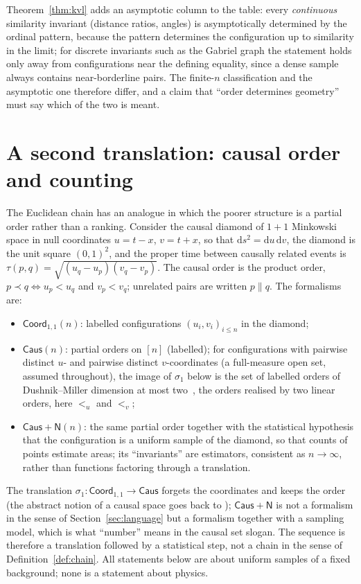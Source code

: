 \documentclass[11pt,a4paper]{article}
\theoremstyle{plain}
\theoremstyle{definition}
\theoremstyle{remark}
\newcommand{\Fcoord}{\mathsf{Coord}}
\newcommand{\Fcaus}{\mathsf{Caus}}
\newcommand{\Fcausn}{\mathsf{Caus}{+}\mathsf{N}}
\newcommand{\incomp}{\parallel}
\newcommand{\dd}{\mathrm{d}}
\begin{document}
Theorem~\ref{thm:kvl} adds an asymptotic column to the table: every \emph{continuous} similarity invariant (distance ratios, angles) is asymptotically determined by the ordinal pattern, because the pattern determines the configuration up to similarity in the limit; for discrete invariants such as the Gabriel graph the statement holds only away from configurations near the defining equality, since a dense sample always contains near-borderline pairs. The finite-$n$ classification and the asymptotic one therefore differ, and a claim that ``order determines geometry'' must say which of the two is meant.

\section{A second translation: causal order and counting}\label{sec:lorentz}

The Euclidean chain has an analogue in which the poorer structure is a partial order rather than a ranking. Consider the causal diamond of $1{+}1$ Minkowski space in null coordinates $u=t-x$, $v=t+x$, so that $\dd s^2=\dd u\,\dd v$, the diamond is the unit square $(0,1)^2$, and the proper time between causally related events is $\tau(p,q)=\sqrt{(u_q-u_p)(v_q-v_p)}$. The causal order is the product order, $p\prec q\iff u_p<u_q$ and $v_p<v_q$; unrelated pairs are written $p\incomp q$. The formalisms are:
\begin{itemize}[leftmargin=2em]
\item $\Fcoord_{1,1}(n)$: labelled configurations $(u_i,v_i)_{i\le n}$ in the diamond;
\item $\Fcaus(n)$: partial orders on $[n]$ (labelled); for configurations with pairwise distinct $u$- and pairwise distinct $v$-coordinates (a full-measure open set, assumed throughout), the image of $\sigma_1$ below is the set of labelled orders of Dushnik--Miller dimension at most two~\citep{dushnik1941}, the orders realised by two linear orders, here $<_u$ and $<_v$;
\item $\Fcausn(n)$: the same partial order together with the statistical hypothesis that the configuration is a uniform sample of the diamond, so that counts of points estimate areas; its ``invariants'' are estimators, consistent as $n\to\infty$, rather than functions factoring through a translation.
\end{itemize}
The translation $\sigma_1\colon\Fcoord_{1,1}\to\Fcaus$ forgets the coordinates and keeps the order (the abstract notion of a causal space goes back to \citet{kronheimer1967}); $\Fcausn$ is not a formalism in the sense of Section~\ref{sec:language} but a formalism together with a sampling model, which is what ``number'' means in the causal set slogan. The sequence is therefore a translation followed by a statistical step, not a chain in the sense of Definition~\ref{def:chain}. All statements below are about uniform samples of a fixed background; none is a statement about physics.
\end{document}
